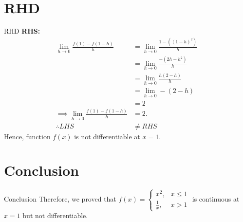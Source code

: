 \documentclass{beamer}
\providecommand{\brak}[1]{\ensuremath{\left(#1\right)}}
\begin{document}
\section{RHD}
\begin{frame}{RHD}
\textbf{RHS:}
            \begin{align}
                 \lim_{h \to 0}\frac{f\brak{1} - f\brak{1-h}}{h}  &= \lim_{h \to 0}\frac{1 -\brak{  \brak{1 -h}^2}}{h}\\
                                                                                      &= \lim_{h \to 0}\frac{-\brak{2h - h^2}}{h}\\
                    &= \lim_{h \to 0}\frac{h\brak{2 - h}}{h}\\                                       
                &= \lim_{h \to 0}-\brak{2 - h}\\    & = 2\\
                 \implies  \lim_{h \to 0}\frac{f\brak{1} - f\brak{1-h}}{h} &= 2.\\
                 \therefore LHS &\neq RHS \nonumber
            \end{align}
    Hence, function $f(x)$ is not differentiable at $ x = 1 $.
\end{frame}


\section{Conclusion}
\begin{frame}{Conclusion}
Therefore, we proved that  $ f\brak{x} = \begin{cases}
                                         x^2, & x \leq 1 \\ 
                                        \frac{1}{x}, & x > 1
                                        \end{cases} $ is continuous at $ x = 1 $ but not differentiable. 
\end{frame}
\end{document}
